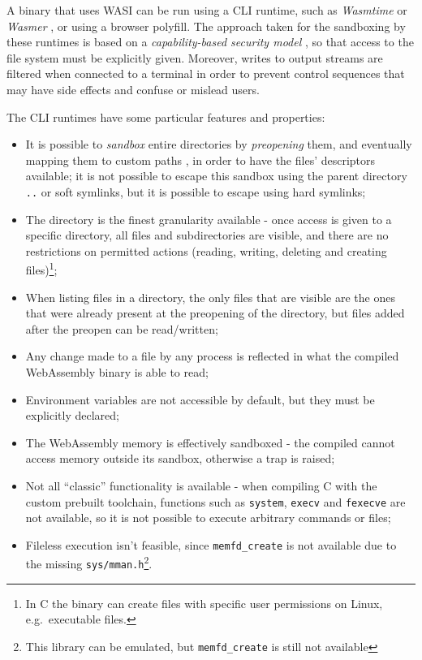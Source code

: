 A binary that uses WASI can be run using a CLI runtime, such as \textit{Wasmtime} \cite{wasmtime} or \textit{Wasmer} \cite{wasmer},
or using a browser polyfill.
The approach taken for the sandboxing by these runtimes is based on a \textit{capability-based security model} \cite{wasmtime-security-sandboxing},
so that access to the file system must be explicitly given.
Moreover, writes to output streams are filtered when connected to a terminal in order to prevent control sequences
that may have side effects and confuse or mislead users.

The CLI runtimes have some particular features and properties:
\begin{itemize}
  \item It is possible to \textit{sandbox} entire directories by \textit{preopening} them, and eventually mapping them to custom paths
        , in order to have the files' descriptors available; it is not possible to escape this sandbox using the parent directory \texttt{..}
        or soft symlinks, but it is possible to escape using hard symlinks;
  \item The directory is the finest granularity available - once access is given to a specific directory, all files and subdirectories are
        visible, and there are no restrictions on permitted actions (reading, writing, deleting and creating files)\footnote{In C the binary can create files with specific user permissions on Linux, e.g.\ executable files.};
  \item When listing files in a directory, the only files that are visible are the ones that were already present at the preopening of the directory,
        but files added after the preopen can be read/written;
  \item Any change made to a file by any process is reflected in what the compiled WebAssembly binary is able to read;
  \item Environment variables are not accessible by default, but they must be explicitly declared;
  \item The WebAssembly memory is effectively sandboxed - the compiled cannot access memory outside its sandbox, otherwise a trap is raised;
  \item Not all ``classic'' functionality is available - when compiling C with the custom prebuilt toolchain,
        functions such as \texttt{system}, \texttt{execv} and \texttt{fexecve} are not available,
        so it is not possible to execute arbitrary commands or files;
  \item Fileless execution isn't feasible, since \texttt{memfd\_create} is not available due to the missing
        \texttt{sys/mman.h}\footnote{This library can be emulated, but \texttt{memfd\_create} is still not available}.
\end{itemize}

